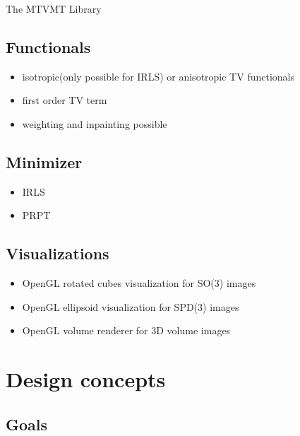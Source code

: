 \begin{chapter}{The MTVMT Library}
\subsection{Functionals} %
\label{sub:Functionals}
\begin{itemize}
    \item isotropic(only possible for IRLS) or anisotropic TV functionals
    \item first order TV term
    \item weighting and inpainting possible
\end{itemize}

\subsection{Minimizer} %
\label{sub:Minimizer}
\begin{itemize}
	\item IRLS
	\item PRPT
\end{itemize}

\subsection{Visualizations} %
\label{sub:Visualizations}
\begin{itemize}
    \item OpenGL rotated cubes visualization for SO(3) images
    \item OpenGL ellipsoid visualization for SPD(3) images
    \item OpenGL volume renderer for 3D volume images
\end{itemize}


\section{Design concepts} %
\label{sec:Design}

\subsection{Goals} %
\label{sub:Goals}


\end{chapter}
